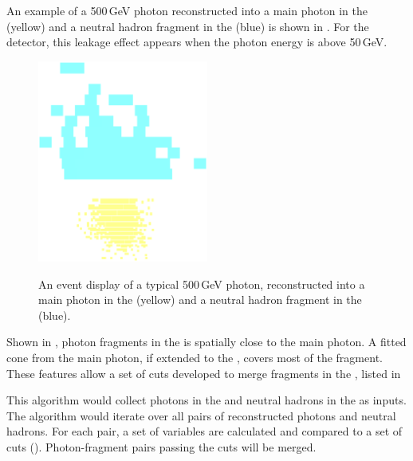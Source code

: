 An example of a 500\,GeV photon reconstructed into a main photon in the \ECAL (yellow) and a neutral hadron fragment in the \HCAL (blue) is shown in . For the \ILD detector, this \ECAL leakage effect appears when the photon energy is above 50\,GeV.


\begin{figure}[tbph]
\centering
{\includegraphics[width=0.5\textwidth]{photon/hcalfrag}}%
\caption{An event display of a typical 500\,GeV photon, reconstructed into a main photon in the \ECAL (yellow) and a neutral hadron fragment in the \HCAL (blue).}
\label{fig:photonEvtDspHCalFrag}
\end{figure}

Shown in  , photon fragments in the \HCAL is  spatially close to the main photon. A fitted cone from the main photon, if extended to the \HCAL, covers most of the fragment. These features allow a set of cuts developed to merge  fragments in the \HCAL, listed in 

This algorithm would collect photons in the \ECAL and neutral hadrons in the \HCAL as inputs. The algorithm would iterate over all pairs of reconstructed photons and neutral hadrons. For each pair, a set of variables are calculated and compared to a set of cuts (). Photon-fragment pairs passing the cuts will be merged.

